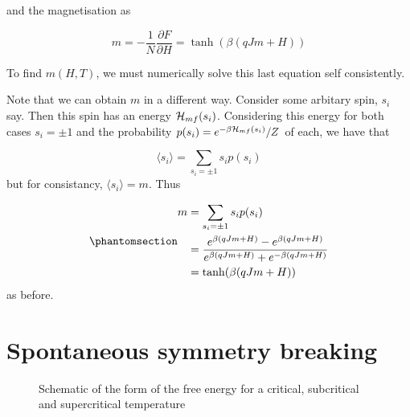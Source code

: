 \documentclass[
  letterpaper,
  enabledeprecatedfontcommands]{report}
\begin{document}
and the magnetisation as

\[
m=-\frac{1}{N}\frac{\partial F}{\partial H}=\tanh(\beta(qJm+H))
\]

To find \(m(H,T)\), we must numerically solve this last equation self
consistently.

Note that we can obtain \(m\) in a different way. Consider some arbitary
spin, \(s_i\) say. Then this spin has an energy \({\cal H}_{mf}(s_i)\).
Considering this energy for both cases \(s_i=\pm 1\) and the probability
\(p(s_i)=e^{-\beta{\cal H}_{mf}(s_i)}/Z\) of each, we have that

\[\langle s_i\rangle=\sum_{s_i=\pm 1}s_ip(s_i)\] but for consistancy,
\(\langle s_i\rangle=m\). Thus

\begin{equation}\phantomsection\label{eq-mfmag}{
\begin{aligned}
m & = \sum_{s_i=\pm 1}s_ip(s_i)\nonumber\\
 \: & = \frac{e^{\beta(qJm+H)}-e^{\beta(qJm+H)}} {e^{\beta(qJm+H)}+e^{-\beta(qJm+H)}}\nonumber\\
 \: & = \tanh(\beta(qJm+H))
\end{aligned}}\end{equation} as before.

\section{Spontaneous symmetry breaking}\label{sec-breaking}

\begin{figure}


\caption{\label{fig-freeenergy}Schematic of the form of the free energy
for a critical, subcritical and supercritical temperature}

\end{figure}%
\end{document}
